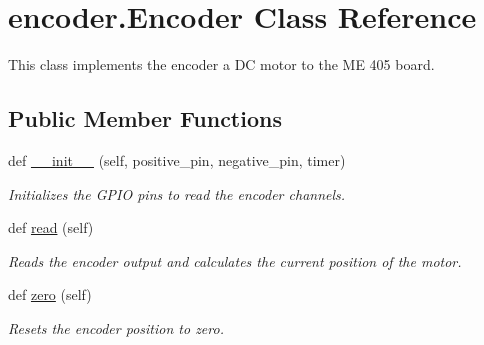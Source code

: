 \hypertarget{classencoder_1_1Encoder}{}\section{encoder.\+Encoder Class Reference}
\label{classencoder_1_1Encoder}


This class implements the encoder a DC motor to the ME 405 board.  


\subsection*{Public Member Functions}
\begin{DoxyCompactItemize}
\item 
def \hyperlink{classencoder_1_1Encoder_ae88fa84fa0eb74af82ddec03d27a1e07}{\+\_\+\+\_\+init\+\_\+\+\_\+} (self, positive\+\_\+pin, negative\+\_\+pin, timer)
\begin{DoxyCompactList}\small\item\em Initializes the G\+P\+IO pins to read the encoder channels. \end{DoxyCompactList}\item 
def \hyperlink{classencoder_1_1Encoder_aa1c1535160682500f5214f45d8197027}{read} (self)\hypertarget{classencoder_1_1Encoder_aa1c1535160682500f5214f45d8197027}{}\label{classencoder_1_1Encoder_aa1c1535160682500f5214f45d8197027}

\begin{DoxyCompactList}\small\item\em Reads the encoder output and calculates the current position of the motor. \end{DoxyCompactList}\item 
def \hyperlink{classencoder_1_1Encoder_ae238ecdbcbce8a193c2e0ffbb4d1dd29}{zero} (self)
\begin{DoxyCompactList}\small\item\em Resets the encoder position to zero. \end{DoxyCompactList}\end{DoxyCompactItemize}
